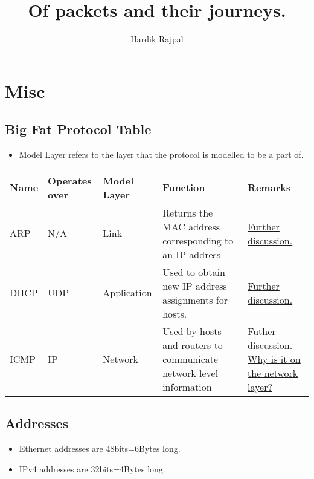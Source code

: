 \documentclass{report}
\author{Hardik Rajpal}
\title{Of packets and their journeys.}
\newcommand{\protorow}[5]{#1 & #2 & #3 & #4 & #5\\ \hline}
\begin{document}
\maketitle
\tableofcontents
\chapter{Misc}
\section{Big Fat Protocol Table}
\begin{itemize}
\item Model Layer refers to the layer that the protocol is modelled to be a part of.
\end{itemize}
\begin{center}
\begin{tabular}{| p{1cm} | p{2cm} | p{2.5cm} | p{5cm} | p{4cm} | }
\hline
\protorow{Name}{Operates over}{Model Layer}{Function}{Remarks}
\protorow{ARP}{N/A}{Link}{Returns the MAC address corresponding to an IP address}{\hyperref[sec:arp]{Further discussion.}}
\protorow{DHCP}{UDP}{Application}{Used to obtain new IP address assignments for hosts.}{\hyperref[sec:dhcp]{Further discussion.}}
\protorow{ICMP}{IP}{Network}{Used by hosts and routers to communicate network level information}{\hyperref[sec:icmp]{Futher discussion.} \href{https://serverfault.com/questions/511965/why-is-icmp-categorized-as-a-layer-3-protocol}{Why is it on the network layer?}}
\end{tabular}
\end{center}
\section{Addresses}
\begin{itemize}
\item Ethernet addresses are 48bits=6Bytes long.
\item IPv4 addresses are 32bits=4Bytes long.
\end{itemize}
\end{document}
